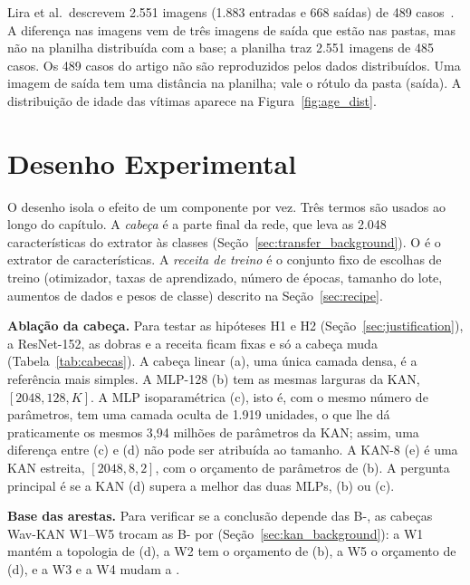 Lira et al.\ descrevem 2.551 imagens (1.883 entradas e 668 saídas) de 489 casos~\cite{Lira2025deep}. A diferença nas imagens vem de três imagens de saída que estão nas pastas, mas não na planilha distribuída com a base; a planilha traz 2.551 imagens de 485 casos. Os 489 casos do artigo não são reproduzidos pelos dados distribuídos. Uma imagem de saída tem uma distância na planilha; vale o rótulo da pasta (saída). A distribuição de idade das vítimas aparece na Figura~\ref{fig:age_dist}.


\section{Desenho Experimental}
\label{sec:design}

O desenho isola o efeito de um componente por vez. Três termos são usados ao longo do capítulo. A \emph{cabeça} é a parte final da rede, que leva as 2.048 características do extrator às classes (Seção~\ref{sec:transfer_background}). O \emph{} é o extrator de características. A \emph{receita de treino} é o conjunto fixo de escolhas de treino (otimizador, taxas de aprendizado, número de épocas, tamanho do lote, aumentos de dados e pesos de classe) descrito na Seção~\ref{sec:recipe}.

\textbf{Ablação da cabeça.} Para testar as hipóteses H1 e H2 (Seção~\ref{sec:justification}), a ResNet-152, as dobras e a receita ficam fixas e só a cabeça muda (Tabela~\ref{tab:cabecas}). A cabeça linear (a), uma única camada densa, é a referência mais simples. A MLP-128 (b) tem as mesmas larguras da KAN, $[2048, 128, K]$. A MLP isoparamétrica (c), isto é, com o mesmo número de parâmetros, tem uma camada oculta de 1.919 unidades, o que lhe dá praticamente os mesmos 3,94 milhões de parâmetros da KAN; assim, uma diferença entre (c) e (d) não pode ser atribuída ao tamanho. A KAN-8 (e) é uma KAN estreita, $[2048, 8, 2]$, com o orçamento de parâmetros de (b). A pergunta principal é se a KAN (d) supera a melhor das duas MLPs, (b) ou (c).

\textbf{Base das arestas.} Para verificar se a conclusão depende das B-, as cabeças Wav-KAN W1--W5 trocam as B- por  (Seção~\ref{sec:kan_background}): a W1 mantém a topologia de (d), a W2 tem o orçamento de (b), a W5 o orçamento de (d), e a W3 e a W4 mudam a .

